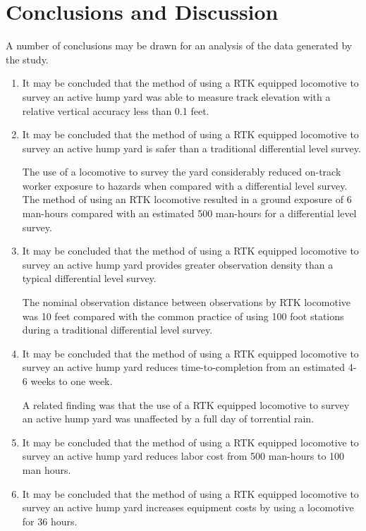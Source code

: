 \section{Conclusions and Discussion}
A number of conclusions may be drawn for an analysis of the data generated by the study.
\begin{enumerate}
\item 
It may be concluded that the method of using a RTK equipped locomotive to survey an active hump yard was able to measure track elevation with a relative vertical accuracy less than 0.1 feet.

\item 
It may be concluded that the method of using a RTK equipped locomotive to survey an active hump yard is safer than a traditional differential level survey.

The use of a locomotive to survey the yard considerably reduced on-track worker exposure to hazards when compared with a differential level survey. The method of using an RTK locomotive resulted in a ground exposure of 6 man-hours compared with an estimated 500 man-hours for a differential level survey.

\item 
It may be concluded that the method of using a RTK equipped locomotive to survey an active hump yard provides greater observation density than a typical differential level survey.

The nominal observation distance between observations by RTK locomotive was 10 feet compared with the common practice of using 100 foot stations during a traditional differential level survey.

\item 
It may be concluded that the method of using a RTK equipped locomotive to survey an active hump yard reduces time-to-completion from an estimated 4-6 weeks to one week.

A related finding was that the use of a RTK equipped locomotive to survey an active hump yard was unaffected by a full day of torrential rain.

\item 
It may be concluded that the method of using a RTK equipped locomotive to survey an active hump yard reduces labor cost from 500 man-hours to 100 man hours.

\item 
It may be concluded that the method of using a RTK equipped locomotive to survey an active hump yard increases equipment costs by using a locomotive for 36 hours.


\end{enumerate}
